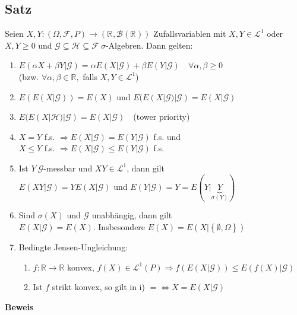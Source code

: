 \documentclass[german,10pt,oneside, fleqn, a4paper]{article}
\newcommand {\R}	{\mathbb{R}}
\newcommand{\Ra}	{\Rightarrow}
\newcommand{\LRa}{\Leftrightarrow}
\newcommand{\ra}{\rightarrow}
\newcommand{\brc}[1]{\left(#1\right)}
\newcommand{\brac}[1]{\left\lbrace #1\right\rbrace}
\newcommand{\mc}[1]{\mathcal{#1}}
\newcommand{\lp}[1]{\mc{L}^{#1}}
\newcommand{\beweis}{\textbf{Beweis}\\}
\newcommand{\1}[1]{1_{#1}}
\newcommand{\2}[1]{\1{\brac{#1}}}
\newcommand{\rbor}[1][d]{\brc{\R^{#1},\mc{B}\brc{\R^{#1}}}}
\newcommand{\raum}{\brc{\Omega,\mc{F},P}}
\newcommand{\g}{\mc{G}}
\newcommand{\f}{\mc{F}}
\begin{document}
\subsection{Satz}
\label{6.2}
Seien $X,Y:\raum\ra\rbor[]$ Zufallsvariablen mit $X,Y\in\lp{1}$ oder $X,Y\geq 0$ und $\g\subseteq\mc{H}\subseteq\f\ \sigma$-Algebren. Dann gelten:\begin{enumerate}[label=(\alph*)]
\item $E(\alpha X+\beta Y|\g)=\alpha E(X|\g)+\beta E(Y|\g)\quad\forall\alpha,\beta\geq0$\\
(bzw. $\forall\alpha,\beta\in\R,$ falls $X,Y\in\lp{1}$)
\item $E(E(X|\g))=E(X)$ und $E(E(X|\g)|\g)=E(X|\g)$
\item $E(E(X|\mc{H})|\g)=E(X|\g)$\ \ (tower priority)
\item $X=Y$ f.s. $\Ra E(X|\g)=E(Y|\g)$ f.s. und\\
 $X\leq Y$ f.s. $\Ra E(X|\g)\leq E(Y|\g)$ f.s.
\item Ist $Y\ \g$-messbar und $XY\in\lp{1}$, dann gilt \\
$E(XY|\g)=YE(X|\g)$ und $E(Y|\g)=Y=E(Y|\underbrace{Y}_{\sigma(Y)})$
\item Sind $\sigma(X)$ und $\g$ unabhängig, dann gilt \\
$E(X|\g)=E(X)$. Insbesondere $E(X)=E(X|\brac{\emptyset,\Omega})$
\item Bedingte Jensen-Ungleichung:
\begin{enumerate}[label=(\roman*)]
	\item $f:\R\ra\R$ konvex, $f(X)\in\lp{1}(P)\Ra f(E(X|\g))\leq E(f(X)|\g)$
	\item Ist $f$ strikt konvex, so gilt in i) \grqq$=$\grqq$\LRa X=E(X|\g)$
\end{enumerate}
\end{enumerate}
\beweis
\end{document}
